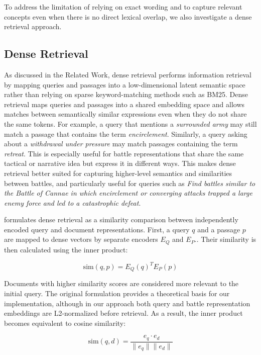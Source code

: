 To address the limitation of relying on exact wording and to capture relevant concepts even when there is no direct lexical overlap, we also investigate a dense retrieval approach.
\subsection{Dense Retrieval}
As discussed in the Related Work, dense retrieval performs information retrieval by mapping queries and passages into a low-dimensional latent semantic space rather than relying on sparse keyword-matching methods such as BM25. Dense retrieval maps queries and passages into a shared embedding space and allows matches between semantically similar expressions even when they do not share the same tokens. For example, a query that mentions a \textit{surrounded army} may still match a passage that contains the term \textit{encirclement}. Similarly, a query asking about a \textit{withdrawal under pressure} may match passages containing the term \textit{retreat}. This is especially useful for battle representations that share the same tactical or narrative idea but express it in different ways. This makes dense retrieval better suited for capturing higher-level semantics and similarities between battles, and particularly useful for queries such as \textit{Find battles similar to the Battle of Cannae in which encirclement or converging attacks trapped a large enemy force and led to a catastrophic defeat}.

\citet{karpukhin2020dpr} formulates dense retrieval as a similarity comparison between independently encoded query and document representations. First, a query $q$ and a passage $p$ are mapped to dense
vectors by separate encoders $E_Q$ and $E_P$.. Their similarity is then calculated using the inner product: 

\begin{equation}
    \mathrm{sim}(q,p) = E_Q(q)^{T} E_P(p)
    \label{eq:dense-similarity}
\end{equation}


Documents with higher similarity scores are considered more relevant to the initial query. The original formulation provides a theoretical basis for our implementation, although in our approach both query and battle representation embeddings are L2-normalized before retrieval. As a result, the inner product becomes equivalent to cosine similarity:

\begin{equation}
    \mathrm{sim}(q,d) =
    \frac{e_q \cdot e_d}
    {\|e_q\| \|e_d\|}
    \label{eq:cosine-similarity}
\end{equation}


